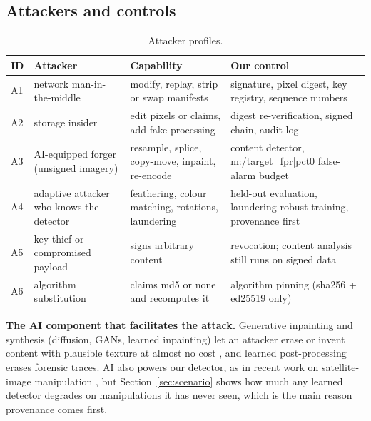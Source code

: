 \subsection{Attackers and controls}
\begin{table}[!htbp]
\centering\small
\begin{tabularx}{\textwidth}{|L{0.9cm}|L{3.8cm}|Y|Y|}
\hline
\textbf{ID} & \textbf{Attacker} & \textbf{Capability} & \textbf{Our control}\\
\hline
A1 & network man-in-the-middle & modify, replay, strip or swap manifests & signature, pixel digest, key registry, sequence numbers\\
\hline
A2 & storage insider & edit pixels or claims, add fake processing & digest re-verification, signed chain, audit log\\
\hline
A3 & AI-equipped forger (unsigned imagery) & resample, splice, copy-move, inpaint, re-encode & content detector, {{m:/target_fpr|pct0}} false-alarm budget\\
\hline
A4 & adaptive attacker who knows the detector & feathering, colour matching, rotations, laundering & held-out evaluation, laundering-robust training, provenance first\\
\hline
A5 & key thief or compromised payload & signs arbitrary content & revocation; content analysis still runs on signed data\\
\hline
A6 & algorithm substitution & claims md5 or none and recomputes it & algorithm pinning (sha256 + ed25519 only)\\
\hline
\end{tabularx}
\caption{Attacker profiles.}
\end{table}

\textbf{The AI component that facilitates the attack.} Generative inpainting and synthesis (diffusion, GANs, learned inpainting) let an attacker erase or invent content with plausible texture at almost no cost \cite{zhao}, and learned post-processing erases forensic traces. AI also powers our detector, as in recent work on satellite-image manipulation \cite{horvath}, but Section~\ref{sec:scenario} shows how much any learned detector degrades on manipulations it has never seen, which is the main reason provenance comes first.

